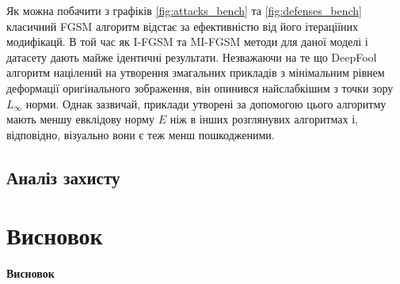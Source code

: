 \documentclass[a4paper,14pt]{extreport}
\begin{document}
	Як можна побачити з графіків \ref{fig:attacks_bench} та \ref{fig:defenses_bench} класичний FGSM алгоритм відстає за ефективністю від його ітераціїних модифікацй. В той час як I-FGSM та MI-FGSM методи для даної моделі і датасету дають майже ідентичні результати. Незважаючи на те що DeepFool алгоритм націлений на утворення змагальних прикладів з мінімальним рівнем деформації оригінального зображення, він опинився найслабкішим з точки зору $L_{\infty}$ норми. Однак зазвичай, приклади утворені за допомогою цього алгоритму мають меншу евклідову норму $E$ ніж в інших розглянувих алгоритмах і, відповідно, візуально вони є теж менш пошкодженими.

	\section{Аналіз захисту}

	
	\chapter{Висновок} 
	\large{\textbf{Висновок}} \\

	\nocite{goodfellow2014explaining}
	\nocite{kurakin2016adversarial}
	\nocite{moosavidezfooli2015deepfool}
	\nocite{dong2017boosting}
	\nocite{dong2019benchmarking}
	\nocite{yuan2017adversarial}
	\nocite{kurakin2018adversarial}
	\nocite{naseer2018local}
	\nocite{santhanam2018defending}
	\nocite{prakash2018deflecting}
	\printbibliography[title={Бібліографія}]
\end{document}

